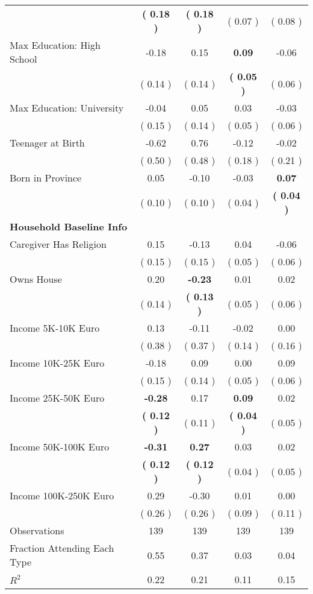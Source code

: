 \begin{table}[H]
{\begin{tabular}{lcccc}
\quad  & \textbf{(     0.18 )} & \textbf{(     0.18 )}  & (     0.07 )  & (     0.08 )  \\
\quad Max Education: High School &     -0.18 &      0.15 & \textbf{     0.09} &     -0.06 \\
\quad  & (     0.14 ) & (     0.14 )  & \textbf{(     0.05 )}  & (     0.06 )  \\
\quad Max Education: University &     -0.04 &      0.05 &      0.03 &     -0.03 \\
\quad  & (     0.15 ) & (     0.14 )  & (     0.05 )  & (     0.06 )  \\
\quad Teenager at Birth &     -0.62 &      0.76 &     -0.12 &     -0.02 \\
\quad  & (     0.50 ) & (     0.48 )  & (     0.18 )  & (     0.21 )  \\
\quad Born in Province &      0.05 &     -0.10 &     -0.03 & \textbf{     0.07} \\
\quad  & (     0.10 ) & (     0.10 )  & (     0.04 )  & \textbf{(     0.04 )}  \\
\midrule
\textbf{Household Baseline Info} \\
\quad Caregiver Has Religion &      0.15 &     -0.13 &      0.04 &     -0.06 \\
\quad  & (     0.15 ) & (     0.15 )  & (     0.05 )  & (     0.06 )  \\
\quad Owns House &      0.20 & \textbf{    -0.23} &      0.01 &      0.02 \\
\quad  & (     0.14 ) & \textbf{(     0.13 )}  & (     0.05 )  & (     0.06 )  \\
\quad Income 5K-10K Euro &      0.13 &     -0.11 &     -0.02 &      0.00 \\
\quad  & (     0.38 ) & (     0.37 )  & (     0.14 )  & (     0.16 )  \\
\quad Income 10K-25K Euro &     -0.18 &      0.09 &      0.00 &      0.09 \\
\quad  & (     0.15 ) & (     0.14 )  & (     0.05 )  & (     0.06 )  \\
\quad Income 25K-50K Euro & \textbf{    -0.28} &      0.17 & \textbf{     0.09} &      0.02 \\
\quad  & \textbf{(     0.12 )} & (     0.11 )  & \textbf{(     0.04 )}  & (     0.05 )  \\
\quad Income 50K-100K Euro & \textbf{    -0.31} & \textbf{     0.27} &      0.03 &      0.02 \\
\quad  & \textbf{(     0.12 )} & \textbf{(     0.12 )}  & (     0.04 )  & (     0.05 )  \\
\quad Income 100K-250K Euro &      0.29 &     -0.30 &      0.01 &      0.00 \\
\quad  & (     0.26 ) & (     0.26 )  & (     0.09 )  & (     0.11 )  \\
\midrule
Observations & 139 & 139 & 139 & 139 \\
Fraction Attending Each Type &      0.55 &      0.37 &      0.03 &      0.04 \\
\midrule
$ R^2$ &      0.22 &      0.21 &      0.11 &      0.15 \\
\bottomrule
\end{tabular}}
\end{table}
